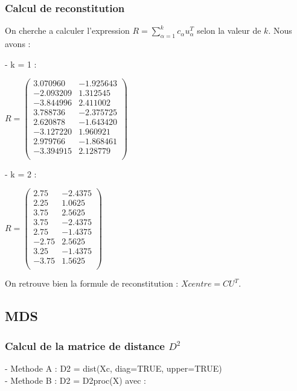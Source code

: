 \documentclass[a4paper,11pt]{article}
\begin{document}
\subsubsection{Calcul de reconstitution} 

\noindent On cherche a calculer l'expression $R = \sum_{\alpha =1}^{k} c_{\alpha} u_{\alpha}^{T}$ selon la valeur de $k$. Nous avons :

- k = 1 : 
\begin{center}
$R = \begin{pmatrix}
3.070960&-1.925643\\
-2.093209&1.312545\\
-3.844996&2.411002\\
3.788736&-2.375725\\
2.620878&-1.643420\\
-3.127220&1.960921\\
2.979766&-1.868461\\
-3.394915&2.128779\\
\end{pmatrix}$
\end{center}

- k = 2 :
\begin{center}
$R = \begin{pmatrix}
2.75&-2.4375 \\
2.25&1.0625 \\
3.75&2.5625 \\
3.75&-2.4375 \\
2.75&-1.4375 \\
-2.75&2.5625 \\
3.25&-1.4375 \\
-3.75&1.5625 \\
\end{pmatrix}$
\end{center}

\noindent On retrouve bien la formule de reconstitution : $Xcentre = CU^T$.


\subsection{MDS}

\subsubsection{ Calcul de la matrice de distance $D^2$}
 
\noindent - Methode A : D2 = dist(Xc, diag=TRUE, upper=TRUE)\\
\noindent - Methode B : D2 = D2proc(X) avec :\\
\end{document}
